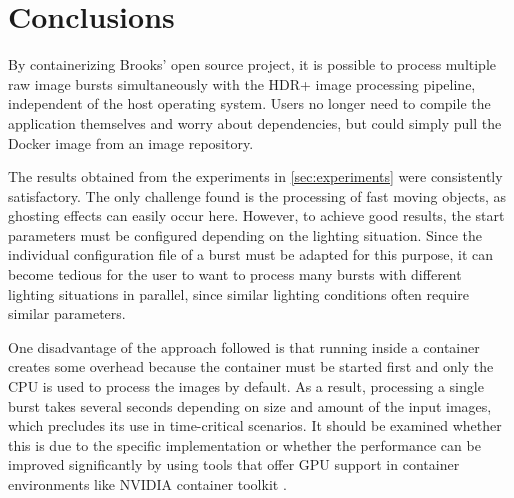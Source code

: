 \documentclass{egpubl}
\begin{document}
\section{Conclusions}
\label{sec:conclusion}

By containerizing Brooks' \cite{Brooks2016git} open source project, it is possible 
to process multiple raw image bursts simultaneously with the HDR+ 
image processing pipeline, independent of the host operating system. Users no 
longer need to compile the application themselves and worry about dependencies, 
but could simply pull the Docker image from an image repository.

The results obtained from the experiments in \cref{sec:experiments} were consistently 
satisfactory. The only challenge found is the processing of fast moving objects, as 
ghosting effects can easily occur here. However, to achieve good results, the start parameters must be configured depending 
on the lighting situation. Since the individual configuration file of a burst must 
be adapted for this purpose, it can become tedious for the user to want to process
many bursts with different lighting situations in parallel, since similar lighting 
conditions often require similar parameters.

One disadvantage of the approach followed is that running inside a container creates 
some overhead because the container must be started first and only the CPU is used 
to process the images by default. As a result, processing a single burst takes several seconds
depending on size and amount of the input images, which precludes its use in time-critical scenarios. 
It should be examined whether this is due to the specific implementation or whether the performance 
can be improved significantly by using tools that offer GPU support in container environments 
like NVIDIA container toolkit \cite{nvidia2015docker}.

%


\end{document}
